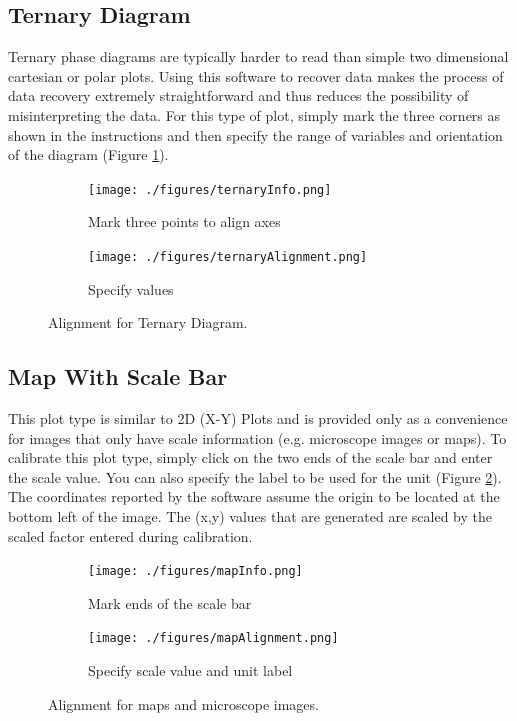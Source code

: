 \documentclass[letterpaper, 10pt]{article}
\begin{document}
\subsection{Ternary Diagram}
Ternary phase diagrams are typically harder to read than simple two dimensional cartesian or polar plots. Using this software to recover data makes the process of data recovery extremely straightforward and thus reduces the possibility of misinterpreting the data. For this type of plot, simply mark the three corners as shown in the instructions and then specify the range of variables and orientation of the diagram (Figure \ref{fig:ternaryAlignment}).

\begin{figure}
\centering
{\begin{subfigure}[b]{0.4\textwidth}
\texttt{[image: ./figures/ternaryInfo.png]}
\caption{Mark three points to align axes}
\end{subfigure}
\begin{subfigure}[b]{0.4\textwidth}
\texttt{[image: ./figures/ternaryAlignment.png]}
\caption{Specify values}
\end{subfigure}}
\caption{Alignment for Ternary Diagram.}
\label{fig:ternaryAlignment}
\end{figure}

\subsection{Map With Scale Bar}
This plot type is similar to 2D (X-Y) Plots and is provided only as a convenience for images that only have scale information (e.g. microscope images or maps). To calibrate this plot type, simply click on the two ends of the scale bar and enter the scale value. You can also specify the label to be used for the unit (Figure \ref{fig:mapAlignment}). The coordinates reported by the software assume the origin to be located at the bottom left of the image. The (x,y) values that are generated are scaled by the scaled factor entered during calibration.

\begin{figure}
\centering
{\begin{subfigure}[b]{0.3\textwidth}
\texttt{[image: ./figures/mapInfo.png]}
\caption{Mark ends of the scale bar}
\end{subfigure}
\begin{subfigure}[b]{0.3\textwidth}
\texttt{[image: ./figures/mapAlignment.png]}
\caption{Specify scale value and unit label}
\end{subfigure}}
\caption{Alignment for maps and microscope images.}
\label{fig:mapAlignment}
\end{figure}
\end{document}
